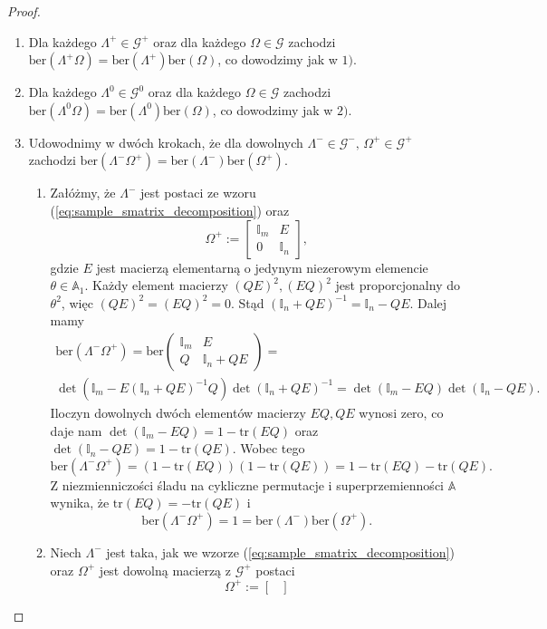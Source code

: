 \documentclass[11pt,a4paper]{report}
\theoremstyle{definition}
\newcommand{\tr}{\mathrm{tr}}
\newcommand{\ber}{\mathrm{ber}}
\newcommand{\I}{\mathbb{I}}
\begin{document}
\begin{proof}
\begin{enumerate}[1)]
		\item Dla każdego $\Lambda^+ \in \mathcal{G}^+$ oraz dla każdego $\Omega \in \mathcal{G}$ zachodzi $\ber (\Lambda^+ \Omega) = \ber(\Lambda^+) \ber(\Omega)$, co dowodzimy jak w $1)$.
		\item Dla każdego $\Lambda^0 \in \mathcal{G}^0$ oraz dla każdego $\Omega \in \mathcal{G}$ zachodzi $\ber (\Lambda^0 \Omega) = \ber(\Lambda^0) \ber(\Omega)$, co dowodzimy jak w $2)$.
		\item Udowodnimy w dwóch krokach, że dla dowolnych $\Lambda^- \!\!\in \mathcal{G}^-,\, \Omega^+ \!\!\in \mathcal{G}^+$ zachodzi $\ber (\Lambda^- \Omega^+) = \ber(\Lambda^-) \ber(\Omega^+)$. \begin{enumerate}[5.1)] \item Załóżmy, że $\Lambda^-$ jest postaci ze wzoru (\ref{eq:sample_smatrix_decomposition}) oraz $$\Omega^+ := \begin{bmatrix}
		      \I_m & E \\
		      0 & \I_n 
		\end{bmatrix}\!,$$
		gdzie $E$ jest macierzą elementarną o jedynym niezerowym elemencie $\theta \in \mathbb{A}_1$. Każdy element macierzy $(QE)^2, (EQ)^2$ jest proporcjonalny do $\theta^2$, więc $(QE)^2= (EQ)^2=0$. Stąd $(\I_n + QE)^{-1} = \I_n - QE$. Dalej mamy
		\begin{equation*}
			\begin{gathered}
				\ber(\Lambda^- \Omega^+) = \ber \left( \begin{matrix}
				\I_m & E \\
				Q & \I_n + QE
				\end{matrix} \right) = \\ \det(\I_m - E(\I_n + QE)^{-1}Q) \det (\I_n + QE)^{-1}
				= \det(\I_m - EQ) \det (\I_n - QE).
			\end{gathered}
		\end{equation*}
		Iloczyn dowolnych dwóch elementów macierzy $EQ, QE$ wynosi zero, co daje nam $\det(\I_m - EQ) = 1 - \tr(EQ)$ oraz $\det (\I_n - QE) = 1 - \tr(QE)$. Wobec tego $$\ber(\Lambda^- \Omega^+) = (1 - \tr(EQ))(1 - \tr(QE)) = 1 - \tr(EQ) - \tr(QE).$$
		Z niezmienniczości śladu na cykliczne permutacje i superprzemienności $\mathbb{A}$ wynika, że $ \tr(EQ) =  - \tr(QE)$ i
		$$\ber (\Lambda^- \Omega^+) = 1 = \ber(\Lambda^-)\ber(\Omega^+).$$
		\item Niech $\Lambda^-$ jest taka, jak we wzorze (\ref{eq:sample_smatrix_decomposition}) oraz $\Omega^+$ jest dowolną macierzą z $\mathcal{G}^+$ postaci $$\Omega^+ := \begin{bmatrix} 

\end{bmatrix}$$
\end{enumerate}
\end{enumerate}
\end{proof}
\end{document}
